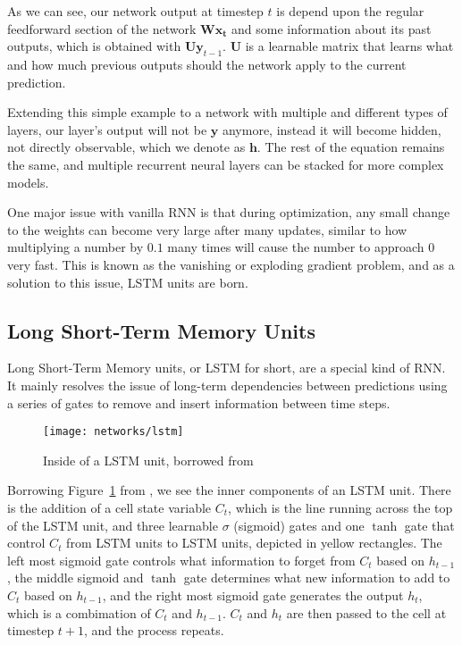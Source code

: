 \documentclass[10pt,twocolumn,letterpaper]{article}
\newcommand{\figref}[1]{Figure~\ref{fig:#1}}
\newcommand{\bs}[1]{\boldsymbol{#1}}
\begin{document}
As we can see, our network output at timestep $t$ is depend upon the regular
feedforward section of the network $\bm{W} \bm{x_{t}}$ and some information
about its past outputs, which is obtained with $\bm{U} \bm{y}_{t-1}$. $\bm{U}$
is a learnable matrix that learns what and how much previous outputs should the
network apply to the current prediction.

Extending this simple example to a network with multiple and different types
of layers, our layer's output will not be $\bs{y}$ anymore, instead it
will become hidden, not directly observable, which we denote as
$\bs{h}$. The rest of the equation remains the same, and multiple
recurrent neural layers can be stacked for more complex models.


One major issue with vanilla RNN is that during optimization, any small change
to the weights can become very large after many updates, similar to how
multiplying a number by $0.1$ many times will cause the number to approach 0
very fast. This is known as the vanishing or exploding gradient problem, and
as a solution to this issue, LSTM units are born.

\subsection{Long Short-Term Memory Units}
Long Short-Term Memory units, or LSTM for short, are a special kind of RNN.
It mainly resolves the issue of long-term dependencies between predictions
using a series of gates to remove and insert information between time steps.
 
\begin{figure}
  \centering
  \texttt{[image: networks/lstm]}
  \caption{Inside of a LSTM unit, borrowed from \cite{colahlstm}}
  \label{fig:lstm}
\end{figure}
 
Borrowing \figref{lstm} from \cite{colahlstm}, we see the inner components of
an LSTM unit. There is the addition of a cell state variable $C_t$, which is
the line running across the top of the LSTM unit, and three learnable $\sigma$
(sigmoid) gates and one $\tanh$ gate that control $C_t$ from LSTM units to
LSTM units, depicted in yellow rectangles. The left most sigmoid gate controls
what information to forget from $C_t$ based on $h_{t-1}$, the middle sigmoid
and $\tanh$ gate determines what new information to add to $C_t$ based on
$h_{t-1}$, and the right most sigmoid gate generates the output $h_t$, which
is a combimation of $C_t$ and $h_{t-1}$. $C_t$ and $h_t$ are then passed to
the cell at timestep $t+1$, and the process repeats.
\end{document}

